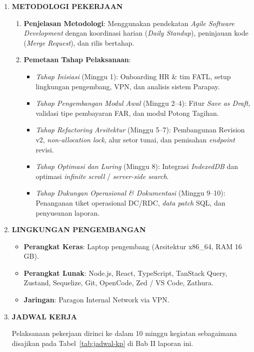\begin{framed}
\begin{enumerate}[label=\arabic*.,leftmargin=0.8cm,itemsep=8pt,topsep=4pt,parsep=0pt,partopsep=0pt]
\item \textbf{METODOLOGI PEKERJAAN}
  \begin{enumerate}[label=\roman*.,topsep=2pt,itemsep=2pt,parsep=0pt,partopsep=0pt,leftmargin=0.5cm]
    \item \textbf{Penjelasan Metodologi}: Menggunakan pendekatan \textit{Agile Software Development} dengan koordinasi harian (\textit{Daily Standup}), peninjauan kode (\textit{Merge Request}), dan rilis bertahap.
    \item \textbf{Pemetaan Tahap Pelaksanaan}:
    \begin{itemize}[topsep=2pt,itemsep=2pt,parsep=0pt,partopsep=0pt,leftmargin=0.4cm]
      \item \textit{Tahap Inisiasi} (Minggu 1): Onboarding HR \& tim FATL, setup lingkungan pengembang, VPN, dan analisis sistem Parapay.
      \item \textit{Tahap Pengembangan Modul Awal} (Minggu 2--4): Fitur \textit{Save as Draft}, validasi tipe pembayaran FAR, dan modul Potong Tagihan.
      \item \textit{Tahap Refactoring Arsitektur} (Minggu 5--7): Pembangunan Revision v2, \textit{non-allocation lock}, alur setor tunai, dan pemisahan \textit{endpoint} revisi.
      \item \textit{Tahap Optimasi dan Luring} (Minggu 8): Integrasi \textit{IndexedDB} dan optimasi \textit{infinite scroll} / \textit{server-side search}.
      \item \textit{Tahap Dukungan Operasional \& Dokumentasi} (Minggu 9--10): Penanganan tiket operasional DC/RDC, \textit{data patch} SQL, dan penyusunan laporan.
    \end{itemize}
  \end{enumerate}

\item \textbf{LINGKUNGAN PENGEMBANGAN}
  \begin{itemize}[topsep=2pt,itemsep=2pt,parsep=0pt,partopsep=0pt,leftmargin=0.5cm]
    \item \textbf{Perangkat Keras}: Laptop pengembang (Arsitektur x86\_64, RAM 16 GB).
    \item \textbf{Perangkat Lunak}: Node.js, React, TypeScript, TanStack Query, Zustand, Sequelize, Git, OpenCode, Zed / VS Code, Zathura.
    \item \textbf{Jaringan}: Paragon Internal Network via VPN.
  \end{itemize}

\item \textbf{JADWAL KERJA}\par\vspace{2pt}
  Pelaksanaan pekerjaan dirinci ke dalam 10 minggu kegiatan sebagaimana disajikan pada Tabel~\ref{tab:jadwal-kp} di Bab II laporan ini.


\end{enumerate}
\end{framed}
